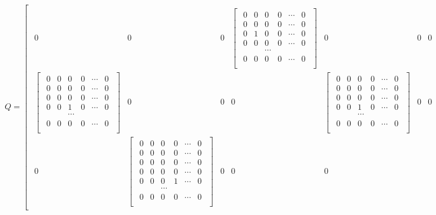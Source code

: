 \documentclass[twoside,a4paper,CCT]{cctart}   %
\begin{document}
$$
  Q = \begin{bmatrix}\begin{smallmatrix}
  0& 0& 0&
  \begin{bmatrix}\begin{smallmatrix}
 0& 0& 0&0&\cdots&0\\
 0& 0& 0&0&\cdots&0\\
 0& 1& 0&0&\cdots&0\\
 0& 0& 0&0&\cdots&0\\
 & & \cdots& &\\
0& 0&0& 0&\cdots&0\\
 \end{smallmatrix}\end{bmatrix}& 0& 0& 0& \cdots&\\
 \begin{bmatrix}\begin{smallmatrix}
 0& 0& 0&0&\cdots&0\\
 0& 0& 0&0&\cdots&0\\
 0& 0& 0&0&\cdots&0\\
 0& 0& 1&0&\cdots&0\\
 & & \cdots& &\\
0& 0& 0& 0&\cdots&0\\
 \end{smallmatrix}\end{bmatrix}&
 0& 0& 0&
 \begin{bmatrix}\begin{smallmatrix}
 0& 0& 0&0&\cdots&0\\
 0& 0& 0&0&\cdots&0\\
 0& 0& 0&0&\cdots&0\\
 0& 0& 1&0&\cdots&0\\
 & & \cdots& &\\
0& 0& 0& 0&\cdots&0\\
 \end{smallmatrix}\end{bmatrix}&
 0& 0& \cdots&\\
 0& \begin{bmatrix}\begin{smallmatrix}
  0& 0& 0&0&\cdots&0\\
 0& 0& 0&0&\cdots&0\\
 0& 0& 0&0&\cdots&0\\
 0& 0& 0&0&\cdots&0\\
 0& 0& 0&1&\cdots&0\\
 & & \cdots& &\\
0& 0& 0& 0&\cdots&0\\
 \end{smallmatrix}\end{bmatrix}& 0& 0& 0&

\end{smallmatrix}
\end{bmatrix}$$
\end{document}
